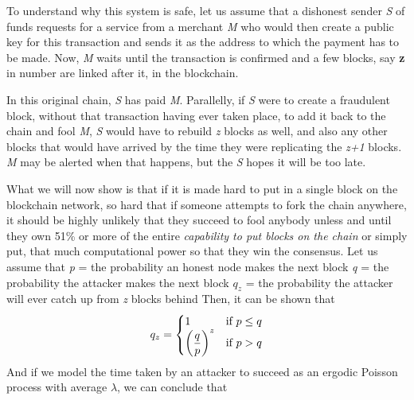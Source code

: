 \documentclass[12pt,a4paper]{report}
\begin{document}
\begin{justify}
\vspace{10mm}
To understand why this system is safe, let us assume that a dishonest sender \textit{S} of funds requests for a service from a merchant \textit{M} who would then create a public key for this transaction and sends it as the address to which the payment has to be made. Now, \textit{M} waits until the transaction is confirmed and a few blocks, say \textbf{z} in number are linked after it, in the blockchain.\newline

In this original chain, \textit{S} has paid \textit{M}. Parallelly, if \textit{S} were to create a fraudulent block, without that transaction having ever taken place, to add it back to the chain and fool \textit{M}, \textit{S} would have to rebuild \textit{z} blocks as well, and also any other blocks that would have arrived by the time they were replicating the \textit{z+1} blocks. \textit{M} may be alerted when that happens, but the \textit{S} hopes it will be too late.\newline

What we will now show is that if it is made hard to put in a single block on the blockchain network, so hard that if someone attempts to fork the chain anywhere, it should be highly unlikely that they succeed to fool anybody unless and until they own 51\% or more of the entire \textit{capability to put blocks on the chain} or simply put, that much computational power so that they win the consensus. Let us assume that\newline
\textit{p} = the probability an honest node makes the next block\newline
\textit{q} = the probability the attacker makes the next block\newline
\textit{$q_z$} = the probability the attacker will ever catch up from \textit{z} blocks behind\newline
Then, it can be shown that \cite{Satoshi}\newline
\begin{equation*} 
  q_z = \begin{cases}
 1  & \text{if $p \leq q$} \\
 $$\left(\dfrac{q}{p}\right)^z$$ & \text{if $p > q$}
\end{cases}
\label{eqn:simple_one} 
\end{equation*}
\newline
And if we model the time taken by an attacker to succeed as an ergodic Poisson process with average $\lambda$, we can conclude that 


\end{justify}
\end{document}
